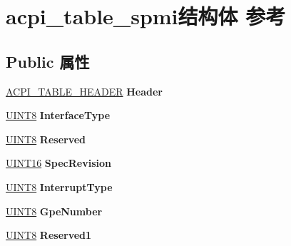 \hypertarget{structacpi__table__spmi}{}\section{acpi\+\_\+table\+\_\+spmi结构体 参考}
\label{structacpi__table__spmi}
\subsection*{Public 属性}
\begin{DoxyCompactItemize}
\item 
\mbox{\label{structacpi__table__spmi_a14f3c3ef65785cbb4c5bfdd6f41e81bf}} 
\hyperlink{structacpi__table__header}{A\+C\+P\+I\+\_\+\+T\+A\+B\+L\+E\+\_\+\+H\+E\+A\+D\+ER} {\bfseries Header}
\item 
\mbox{\label{structacpi__table__spmi_acb89f0771cbc0ec29fc192f4c2e67d67}} 
\hyperlink{_processor_bind_8h_ab27e9918b538ce9d8ca692479b375b6a}{U\+I\+N\+T8} {\bfseries Interface\+Type}
\item 
\mbox{\label{structacpi__table__spmi_af216ecfcd3295ce47550ccb5d95fdc80}} 
\hyperlink{_processor_bind_8h_ab27e9918b538ce9d8ca692479b375b6a}{U\+I\+N\+T8} {\bfseries Reserved}
\item 
\mbox{\label{structacpi__table__spmi_a28e43a2d86493f2e337a19659cbc7299}} 
\hyperlink{_processor_bind_8h_a09f1a1fb2293e33483cc8d44aefb1eb1}{U\+I\+N\+T16} {\bfseries Spec\+Revision}
\item 
\mbox{\label{structacpi__table__spmi_a61aca26d9e5579e5fa9a35ac84235a47}} 
\hyperlink{_processor_bind_8h_ab27e9918b538ce9d8ca692479b375b6a}{U\+I\+N\+T8} {\bfseries Interrupt\+Type}
\item 
\mbox{\label{structacpi__table__spmi_a1a9f695e903cdf386d5fd9d106c0023d}} 
\hyperlink{_processor_bind_8h_ab27e9918b538ce9d8ca692479b375b6a}{U\+I\+N\+T8} {\bfseries Gpe\+Number}
\item 
\mbox{\label{structacpi__table__spmi_a0c44c3c48b649bd63615de4d9f030616}} 
\hyperlink{_processor_bind_8h_ab27e9918b538ce9d8ca692479b375b6a}{U\+I\+N\+T8} {\bfseries Reserved1}

\end{DoxyCompactItemize}
